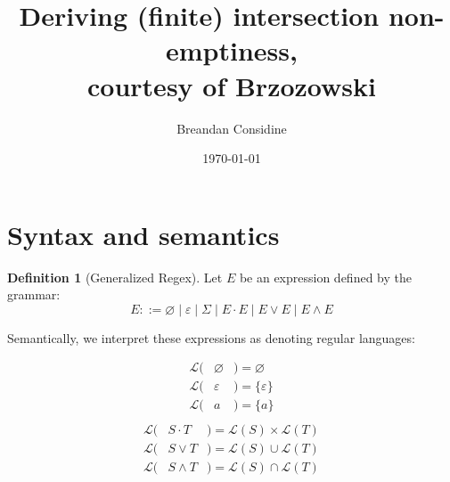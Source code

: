 \documentclass[11pt]{article}
\title{Deriving (finite) intersection non-emptiness,\\ courtesy of Brzozowski}
\author{Breandan Considine}
\date{\today}
\theoremstyle{plain}
\theoremstyle{definition}
\newtheorem{definition}{Definition}
\begin{document}
\maketitle

\section{Syntax and semantics}

\begin{definition}[Generalized Regex]
  Let \( E \) be an expression defined by the grammar:
  \[
    E ::= \varnothing \mid \varepsilon \mid \Sigma \mid E \cdot E \mid E \lor E \mid E \land E
  \]

\noindent Semantically, we interpret these expressions as denoting regular languages:\vspace{-1cm}
  \setlength{\columnseprule}{0pt}
  \setlength{\columnsep}{-3cm}
  \begin{multicols}{2}
    \begin{eqnarray*}
      \mathcal{L}(& \varnothing & ) = \varnothing \\
      \mathcal{L}(& \varepsilon & ) = \{\varepsilon\} \\
      \mathcal{L}(& a           & ) = \{a\}\\
    \end{eqnarray*} \break\vspace{-0.45cm}
    \begin{eqnarray*}
      \mathcal{L}(& S\cdot T    & ) = \mathcal{L}(S) \times \mathcal{L}(T)\\
      \mathcal{L}(& S\vee  T    & ) = \mathcal{L}(S) \cup \mathcal{L}(T)\\
      \mathcal{L}(& S\land T    & ) = \mathcal{L}(S) \cap \mathcal{L}(T)\\
    \end{eqnarray*}
  \end{multicols}
\end{definition}
\end{document}
